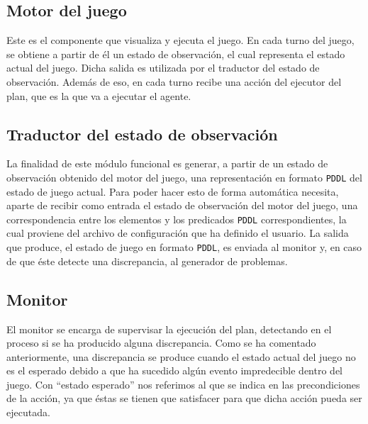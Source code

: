 \subsection{Motor del juego}

Este es el componente que visualiza y ejecuta el juego. En cada turno del juego, se obtiene a partir de él un
estado de observación, el cual representa el estado actual del juego. Dicha salida es utilizada por el
traductor del estado de observación. Además de eso, en cada turno recibe una acción del ejecutor del plan,
que es la que va a ejecutar el agente.

\subsection{Traductor del estado de observación}
\label{sec:translate-state}

La finalidad de este módulo funcional es generar, a partir de un estado de observación obtenido del
motor del juego, una representación en formato \texttt{PDDL} del estado de juego actual. Para poder
hacer esto de forma automática necesita, aparte de recibir como entrada el estado de observación del
motor del juego, una correspondencia entre los elementos y los predicados \texttt{PDDL} correspondientes,
la cual proviene del archivo de configuración que ha definido el usuario. La salida que produce,
el estado de juego en formato \texttt{PDDL}, es enviada al monitor y, en caso de que éste detecte
una discrepancia, al generador de problemas.

\subsection{Monitor}

El monitor se encarga de supervisar la ejecución del plan, detectando en el proceso si se ha producido
alguna discrepancia. Como se ha comentado anteriormente, una discrepancia se produce cuando el estado
actual del juego no es el esperado debido a que ha sucedido algún evento impredecible dentro del juego.
Con ``estado esperado'' nos referimos al que se indica en las precondiciones de la acción, ya que
éstas se tienen que satisfacer para que dicha acción pueda ser ejecutada.

